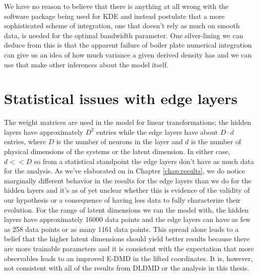 We have no reason to believe that there is anything at all wrong with the software package
being used for KDE and instead postulate that a more sophisticated scheme of integration, one that doesn't
rely as much on smooth data, is needed for the optimal bandwidth parameter. One silver-lining we can
deduce from this is that the apparent failure of boiler plate numerical integration can give us an idea
of how much variance a given derived density has and we can use that make other inferences about 
the model itself.




\section{Statistical issues with edge layers}
The weight matrices are used in the model for linear transformations; the hidden layers 
have approximately $D^2$ entries while the edge layers 
have about $D\cdot d$ entries, where $D$ is the number of neurons in the layer and $d$ is the number 
of physical dimensions of the systems or the latent dimension. In either case, $d <\!\!< D$ so from a 
statistical standpoint the edge layers don't have as much data for the analysis. As we've elaborated on 
in Chapter \ref{chap:results}, we do notice marginally different behavior in the results for the edge 
layers than we do for the hidden layers and it's as of yet unclear whether this is evidence of the 
validity of our hypothesis or a consequence of having less data to fully characterize their evolution. 
For the range of latent dimensions we ran the model with, the hidden layers have approximately 16000 
data points and the edge layers can have as few as 258 data points or as many 1161 data points. This
spread alone leads to a belief that the higher latent dimensions should yield better results because
there are more trainable parameters and it is consistent with the expectation that more observables 
leads to an improved E-DMD in the lifted coordinates. It is, however, not consistent with all of the
results from DLDMD or the analysis in this thesis.

